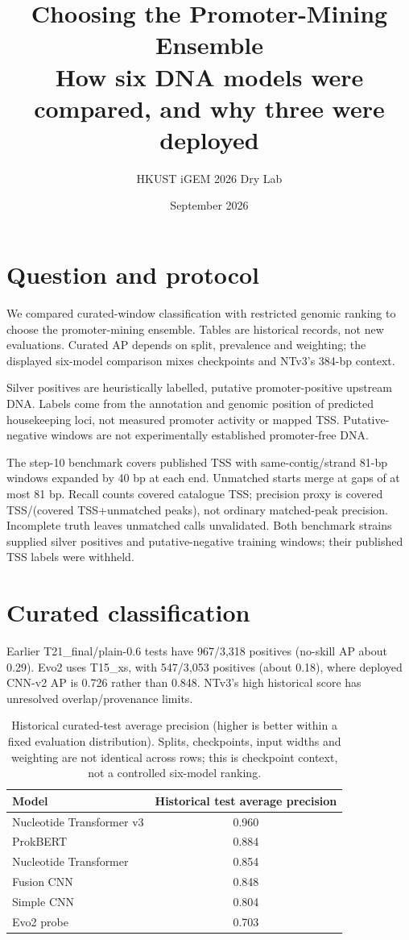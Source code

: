 \documentclass{article}
\title{Choosing the Promoter-Mining Ensemble\\ \large How six DNA models were compared, and why three were deployed}
\date{September 2026}
\author{HKUST iGEM 2026 Dry Lab}
\begin{document}
\maketitle

\section{Question and protocol}
We compared curated-window classification with restricted genomic ranking to choose the promoter-mining ensemble. Tables are historical records, not new evaluations. Curated AP depends on split, prevalence and weighting; the displayed six-model comparison mixes checkpoints and NTv3's 384-bp context.

Silver positives are heuristically labelled, putative promoter-positive upstream DNA. Labels come from the annotation and genomic position of predicted housekeeping loci, not measured promoter activity or mapped TSS. Putative-negative windows are not experimentally established promoter-free DNA.

The step-10 benchmark covers published TSS with same-contig/strand 81-bp windows expanded by 40 bp at each end. Unmatched starts merge at gaps of at most 81 bp. Recall counts covered catalogue TSS; precision proxy is covered TSS/(covered TSS+unmatched peaks), not ordinary matched-peak precision. Incomplete truth leaves unmatched calls unvalidated. Both benchmark strains supplied silver positives and putative-negative training windows; their published TSS labels were withheld.

\section{Curated classification}
Earlier T21\_final/plain-0.6 tests have 967/3,318 positives (no-skill AP about 0.29). Evo2 uses T15\_xs, with 547/3,053 positives (about 0.18), where deployed CNN-v2 AP is 0.726 rather than 0.848. NTv3's high historical score has unresolved overlap/provenance limits.

\begin{table}[h]
\centering
\caption{Historical curated-test average precision (higher is better within a fixed evaluation
distribution). Splits, checkpoints, input widths and weighting are not identical across rows;
this is checkpoint context, not a controlled six-model ranking.}
\label{tab:balanced}
\begin{tabular}{lc}
\toprule
Model & Historical test average precision \\
\midrule
Nucleotide Transformer v3 & 0.960 \\
ProkBERT                  & 0.884 \\
Nucleotide Transformer    & 0.854 \\
Fusion CNN                & 0.848 \\
Simple CNN                & 0.804 \\
Evo2 probe                & 0.703 \\
\bottomrule
\end{tabular}
\end{table}
\end{document}
